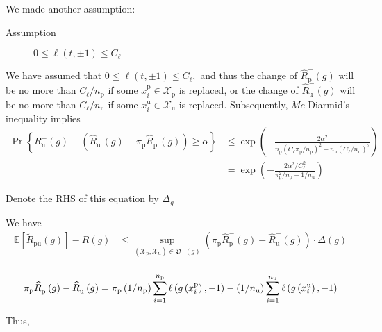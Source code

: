 \documentclass[12pt]{article}
\theoremstyle{definition}
\begin{document}
 We made another assumption:
 
 \begin{description}
 	\item[Assumption] $0\le \ell(t,\pm1)\le C_{\ell}$ 
 \end{description}

We have assumed that $0 \leq \ell(t,\pm 1) \leq C_{\ell},$ and thus the change of $\widehat{R}_{\mathrm{p}}^{-}(g)$ will be no more than $C_{\ell} / n_{\mathrm{p}}$ if some $x_{i}^{\mathrm{p}} \in \mathcal{X}_{\mathrm{p}}$ is replaced, or the change of $\widehat{R}_{\mathrm{u}}^{-}(g)$ will be no more than $C_{\ell} / n_{\mathrm{u}}$ if some
$x_{i}^{\mathrm{u}} \in \mathcal{X}_{\mathrm{u}}$ is replaced. Subsequently, $M c$ Diarmid's inequality implies
\begin{equation}
\begin{aligned}
\label{eq:pr-diff-bound}
\operatorname{Pr}\left\{R_{\mathrm{n}}^{-}(g)-\left(\widehat{R}_{\mathrm{u}}^{-}(g)-\pi_{\mathrm{p}} \widehat{R}_{\mathrm{p}}^{-}(g)\right) \geq \alpha\right\} & \leq \exp \left(-\frac{2 \alpha^{2}}{n_{\mathrm{p}}\left(C_{\ell} \pi_{\mathrm{p}} / n_{\mathrm{p}}\right)^{2}+n_{\mathrm{u}}\left(C_{\ell} / n_{\mathrm{u}}\right)^{2}}\right) \\
&=\exp \left(-\frac{2 \alpha^{2} / C_{\ell}^{2}}{\pi_{\mathrm{p}}^{2} / n_{\mathrm{p}}+1 / n_{\mathrm{u}}}\right)
\end{aligned}
\end{equation}

Denote the RHS of this equation by $\Delta_{g}$

We have
 $$
\begin{aligned}
\mathbb{E}\left[\widetilde{R}_{\mathrm{pu}}(g)\right]-R(g) &\le \sup _{\left(\mathcal{X}_{\mathrm{p}}, \mathcal{X}_{\mathrm{u}}\right) \in \mathfrak{D}^{-}(g)}\left(\pi_{\mathrm{p}} \widehat{R}_{\mathrm{p}}^{-}(g)-\widehat{R}_{\mathrm{u}}^{-}(g)\right) \cdot \Delta(g) \\
\end{aligned}
$$

$$\pi_{\mathrm{p}} \widehat{R}_{\mathrm{p}}^{-}(g)-
\widehat{R}_{\mathrm{u}}^{-}(g)\\
=
\pi_\mathrm{p}\left(1 / n_{\mathrm{p}}\right) \sum_{i=1}^{n_{\mathrm{p}}} \ell\left(g\left(x_{i}^{\mathrm{p}}\right),-1\right)
-\left(1 / n_{\mathrm{u}}\right) \sum_{i=1}^{n_{\mathrm{u}}} \ell\left(g\left(x_{i}^{\mathrm{u}}\right),-1\right)$$

Thus, 
\end{document}
